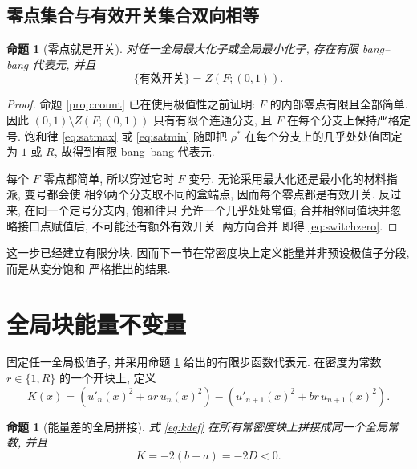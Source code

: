 \documentclass[UTF8]{ctexart}
\newtheorem{proposition}[theorem]{命题}
\begin{document}
\subsection{零点集合与有效开关集合双向相等}

\begin{proposition}[零点就是开关]\label{prop:switchzero}
对任一全局最大化子或全局最小化子, 存在有限 bang--bang 代表元, 并且
\begin{equation}
	\{\text{有效开关}\}=Z(F;(0,1)) .
	\label{eq:switchzero}
\end{equation}
\end{proposition}

\begin{proof}
命题 \ref{prop:count} 已在使用极值性之前证明: $F$ 的内部零点有限且全部简单. 因此
$(0,1)\setminus Z(F;(0,1))$ 只有有限个连通分支, 且 $F$ 在每个分支上保持严格定号. 饱和律
\eqref{eq:satmax} 或 \eqref{eq:satmin} 随即把 $\rho^*$ 在每个分支上的几乎处处值固定为 $1$ 或
$R$, 故得到有限 bang--bang 代表元.

每个 $F$ 零点都简单, 所以穿过它时 $F$ 变号. 无论采用最大化还是最小化的材料指派, 变号都会使
相邻两个分支取不同的盒端点, 因而每个零点都是有效开关. 反过来, 在同一个定号分支内, 饱和律只
允许一个几乎处处常值; 合并相邻同值块并忽略接口点赋值后, 不可能还有额外有效开关. 两方向合并
即得 \eqref{eq:switchzero}.
\end{proof}

这一步已经建立有限分块, 因而下一节在常密度块上定义能量并非预设极值子分段, 而是从变分饱和
严格推出的结果.

\section{全局块能量不变量}

固定任一全局极值子, 并采用命题 \ref{prop:switchzero} 给出的有限步函数代表元. 在密度为常数
$r\in\{1,R\}$ 的一个开块上, 定义
\begin{equation}
	K(x)=\left(u'_n(x)^2+ar\,u_n(x)^2\right)
		-\left(u'_{n+1}(x)^2+br\,u_{n+1}(x)^2\right) .
	\label{eq:kdef}
\end{equation}

\begin{proposition}[能量差的全局拼接]\label{prop:k}
式 \eqref{eq:kdef} 在所有常密度块上拼接成同一个全局常数, 并且
\begin{equation}
	K=-2(b-a)=-2D<0 .
	\label{eq:kval}
\end{equation}
\end{proposition}
\end{document}
